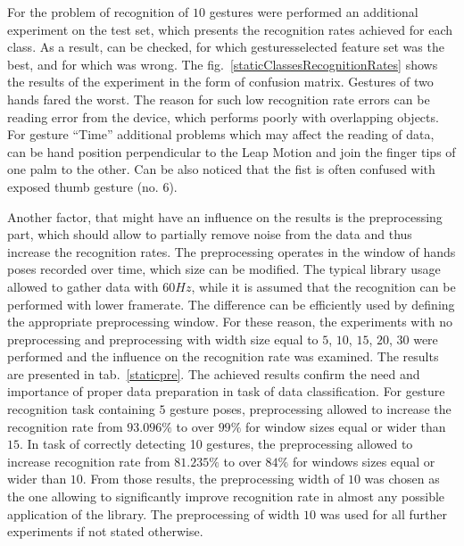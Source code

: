 For the problem of recognition of $10$ gestures were performed an additional experiment on the test set, which presents the recognition rates achieved for each class. As a result, can be checked, for which gesturesselected feature set was the best, and for which was wrong. The fig.~\ref{staticClassesRecognitionRates} shows the results of the experiment in the form of confusion matrix. Gestures of two hands fared the worst. The reason for such low recognition rate errors can be reading error from the device, which performs poorly with overlapping objects. For gesture ``Time'' additional problems which may affect the reading of data, can be hand position perpendicular to the Leap Motion and join the finger tips of one palm to the other. Can be also noticed that the fist is often confused with exposed thumb gesture (no. $6$).

Another factor, that might have an influence on the results is the preprocessing part, which should allow to partially remove noise from the data and thus increase the recognition rates. 
The preprocessing operates in the window of hands poses recorded over time, which size can be modified. 
The typical library usage allowed to gather data with $60Hz$, while it is assumed that the recognition can be performed with lower framerate. The difference can be efficiently used by defining the appropriate preprocessing window.
For these reason, the experiments with no preprocessing and preprocessing with width size equal to $5$, $10$, $15$, $20$, $30$ were performed and the influence on the recognition rate was examined.
The results are presented in tab.~\ref{staticpre}.
The achieved results confirm the need and importance of proper data preparation in task of data classification.
For gesture recognition task containing $5$ gesture poses, preprocessing allowed to increase the recognition rate from $93.096\%$ to over $99\%$ for window sizes equal or wider than $15$. 
In task of correctly detecting 10 gestures, the preprocessing allowed to increase recognition rate from $81.235\%$ to over $84\%$ for windows sizes equal or wider than $10$.
From those results, the preprocessing width of $10$ was chosen as the one allowing to significantly improve recognition rate in almost any possible application of the library.
The preprocessing of width $10$ was used for all further experiments if not stated otherwise.

